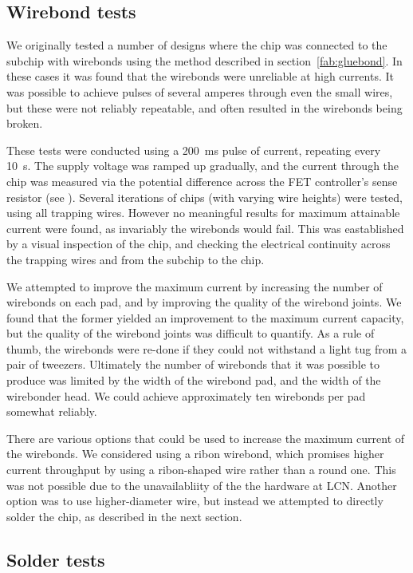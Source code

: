 \subsection{Wirebond tests}

We originally tested a number of designs where the chip was connected to the
subchip with wirebonds using the method described in
section~\ref{fab:gluebond}. In these cases it was found that the wirebonds were
unreliable at high currents. It was possible to achieve pulses of several
amperes through even the small wires, but these were not reliably repeatable,
and often resulted in the wirebonds being broken.

These tests were conducted using a \SI{200}{\milli\second} pulse of current,
repeating every \SI{10}{\second}. The supply voltage was ramped up gradually,
and the current through the chip was measured via the potential difference
across the FET controller's sense resistor (see ).
Several iterations of chips (with varying wire heights) were tested, using all
trapping wires. However no meaningful results for maximum attainable current
were found, as invariably the wirebonds would fail. This was eastablished by a
visual inspection of the chip, and checking the electrical continuity across
the trapping wires and from the subchip to the chip.

We attempted to improve the maximum current by increasing the number of
wirebonds on each pad, and by improving the quality of the wirebond joints. We
found that the former yielded an improvement to the maximum current capacity,
but the quality of the wirebond joints was difficult to quantify. As a rule of
thumb, the wirebonds were re-done if they could not withstand a light tug from
a pair of tweezers. Ultimately the number of wirebonds that it was possible to
produce was limited by the width of the wirebond pad, and the width of the
wirebonder head. We could achieve approximately ten wirebonds per pad somewhat
reliably.

There are various options that could be used to increase the maximum current of
the wirebonds.  We considered using a ribon wirebond, which promises
higher current throughput by using a ribon-shaped wire rather than a round one.
This was not possible due to the unavailabliity of the the hardware at LCN.
Another option was to use higher-diameter wire, but instead we attempted to
directly solder the chip, as described in the next section.

\subsection{Solder tests}

